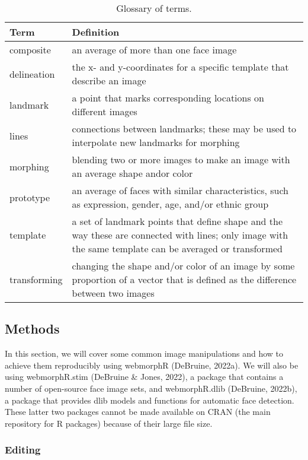 \documentclass[
  doc,floatsintext]{apa6}
\begin{document}
\begin{table}

\caption{\label{tab:glossary}Glossary of terms.}
\centering
\begin{tabular}[t]{l|l}
\hline
Term & Definition\\
\hline
composite & an average of more than one face image\\
\hline
delineation & the x- and y-coordinates for a specific template that describe an image\\
\hline
landmark & a point that marks corresponding locations on different images\\
\hline
lines & connections between landmarks; these may be used to interpolate new landmarks for morphing\\
\hline
morphing & blending two or more images to make an image with an average shape andor color\\
\hline
prototype & an average of faces with similar characteristics, such as expression, gender, age, and/or ethnic group\\
\hline
template & a set of landmark points that define shape and the way these are connected with lines; only image with the same template can be averaged or transformed\\
\hline
transforming & changing the shape and/or color of an image by some proportion of a vector that is  defined as the difference between two images\\
\hline
\end{tabular}
\end{table}

\hypertarget{methods}{%
\subsection{Methods}\label{methods}}

In this section, we will cover some common image manipulations and how to achieve them reproducibly using webmorphR (DeBruine, 2022a). We will also be using webmorphR.stim (DeBruine \& Jones, 2022), a package that contains a number of open-source face image sets, and webmorphR.dlib (DeBruine, 2022b), a package that provides dlib models and functions for automatic face detection. These latter two packages cannot be made available on CRAN (the main repository for R packages) because of their large file size.

\hypertarget{editing}{%
\subsubsection{Editing}\label{editing}}
\end{document}
